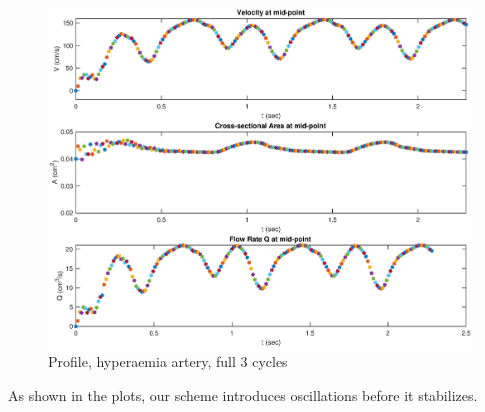 \documentclass[12pt]{article} %
\begin{document}
\begin{figure}[h!]
\caption{Profile, hyperaemia artery, full 3 cycles}
\centering
\includegraphics[width=1.0\textwidth]{full2.eps}
\end{figure}

As shown in the plots, our scheme introduces oscillations before it stabilizes. 

\end{document}
